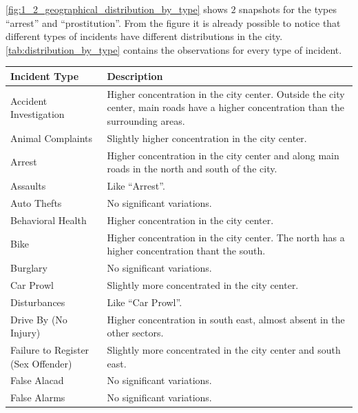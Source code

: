 \cref{fig:1_2_geographical_distribution_by_type} shows $2$ snapshots for the types ``arrest'' and ``prostitution''.
From the figure it is already possible to notice that different types of incidents have different distributions in the city.
\cref{tab:distribution_by_type} contains the observations for every type of incident.

\renewcommand{\arraystretch}{1.5}
\begin{longtable}{ | >{\arraybackslash} m{3.8cm} | >{\arraybackslash} m{11.2cm} | }
    \hline
    \textbf{Incident Type} & \textbf{Description} \\
    \hline
    Accident Investigation  &   Higher concentration in the city center. Outside the city center, main roads have a higher concentration than the surrounding areas. \\
    \hline        
    Animal Complaints       &   Slightly higher concentration in the city center. \\
    \hline
    Arrest                  &   Higher concentration in the city center and along main roads in the north and south of the city. \\
    \hline
    Assaults                &   Like ``Arrest''. \\
    \hline
    Auto Thefts             &   No significant variations. \\
    \hline
    Behavioral Health       &   Higher concentration in the city center. \\
    \hline
    Bike                    &   Higher concentration in the city center. The north has a higher concentration thant the south. \\
    \hline
    Burglary                &   No significant variations. \\
    \hline
    Car Prowl               &   Slightly more concentrated in the city center. \\
    \hline
    Disturbances            &   Like ``Car Prowl''. \\
    \hline
    Drive By (No Injury)    &   Higher concentration in south east, almost absent in the other sectors. \\
    \hline
    Failure to Register (Sex Offender) &   Slightly more concentrated in the city center and south east. \\
    \hline
    False Alacad            &   No significant variations. \\
    \hline
    False Alarms            &   No significant variations. \\
    \hline

\end{longtable}
